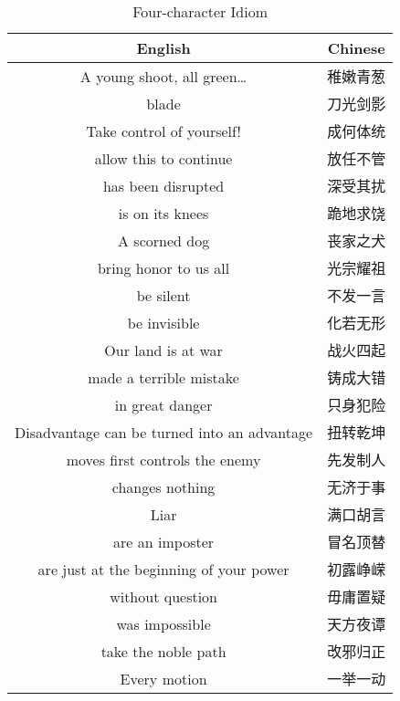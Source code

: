 \begin{table}[!ht]
    \centering
    \caption{Four-character Idiom}
    \begin{tabular}{|c|c|}
    \hline
    \textbf{English} & \textbf{Chinese} \\ \hline
        A young shoot, all green… & 稚嫩青葱 \\ \hline
        blade & 刀光剑影 \\ \hline
        Take control of yourself! & 成何体统 \\ \hline
        allow this to continue & 放任不管 \\ \hline
        has been disrupted & 深受其扰 \\ \hline
        is on its knees & 跪地求饶 \\ \hline
        A scorned dog & 丧家之犬 \\ \hline
        bring honor to us all & 光宗耀祖 \\ \hline
        be silent & 不发一言 \\ \hline
        be invisible & 化若无形 \\ \hline
        Our land is at war & 战火四起 \\ \hline
        made a terrible mistake & 铸成大错 \\ \hline
        in great danger & 只身犯险 \\ \hline
        Disadvantage can be turned into an advantage & 扭转乾坤 \\ \hline
        moves first controls the enemy & 先发制人 \\ \hline
        changes nothing & 无济于事 \\ \hline
        Liar & 满口胡言 \\ \hline
        are an imposter & 冒名顶替 \\ \hline
        are just at the beginning of your power & 初露峥嵘 \\ \hline
        without question & 毋庸置疑 \\ \hline
        was impossible & 天方夜谭 \\ \hline
        take the noble path & 改邪归正 \\ \hline
        Every motion & 一举一动 \\ \hline
    \end{tabular}
\end{table}